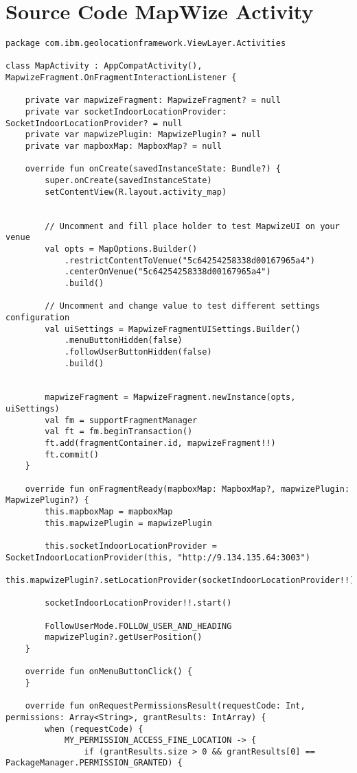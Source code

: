 \section{Source Code MapWize Activity}
\begin{lstlisting}
package com.ibm.geolocationframework.ViewLayer.Activities

class MapActivity : AppCompatActivity(), MapwizeFragment.OnFragmentInteractionListener {

    private var mapwizeFragment: MapwizeFragment? = null
    private var socketIndoorLocationProvider: SocketIndoorLocationProvider? = null
    private var mapwizePlugin: MapwizePlugin? = null
    private var mapboxMap: MapboxMap? = null

    override fun onCreate(savedInstanceState: Bundle?) {
        super.onCreate(savedInstanceState)
        setContentView(R.layout.activity_map)


        // Uncomment and fill place holder to test MapwizeUI on your venue
        val opts = MapOptions.Builder()
            .restrictContentToVenue("5c64254258338d00167965a4")
            .centerOnVenue("5c64254258338d00167965a4")
            .build()

        // Uncomment and change value to test different settings configuration
        val uiSettings = MapwizeFragmentUISettings.Builder()
            .menuButtonHidden(false)
            .followUserButtonHidden(false)
            .build()


        mapwizeFragment = MapwizeFragment.newInstance(opts, uiSettings)
        val fm = supportFragmentManager
        val ft = fm.beginTransaction()
        ft.add(fragmentContainer.id, mapwizeFragment!!)
        ft.commit()
    }

    override fun onFragmentReady(mapboxMap: MapboxMap?, mapwizePlugin: MapwizePlugin?) {
        this.mapboxMap = mapboxMap
        this.mapwizePlugin = mapwizePlugin

        this.socketIndoorLocationProvider = SocketIndoorLocationProvider(this, "http://9.134.135.64:3003")
        this.mapwizePlugin?.setLocationProvider(socketIndoorLocationProvider!!)

        socketIndoorLocationProvider!!.start()

        FollowUserMode.FOLLOW_USER_AND_HEADING
        mapwizePlugin?.getUserPosition()
    }

    override fun onMenuButtonClick() {
    }

    override fun onRequestPermissionsResult(requestCode: Int, permissions: Array<String>, grantResults: IntArray) {
        when (requestCode) {
            MY_PERMISSION_ACCESS_FINE_LOCATION -> {
                if (grantResults.size > 0 && grantResults[0] == PackageManager.PERMISSION_GRANTED) {


\end{lstlisting}
